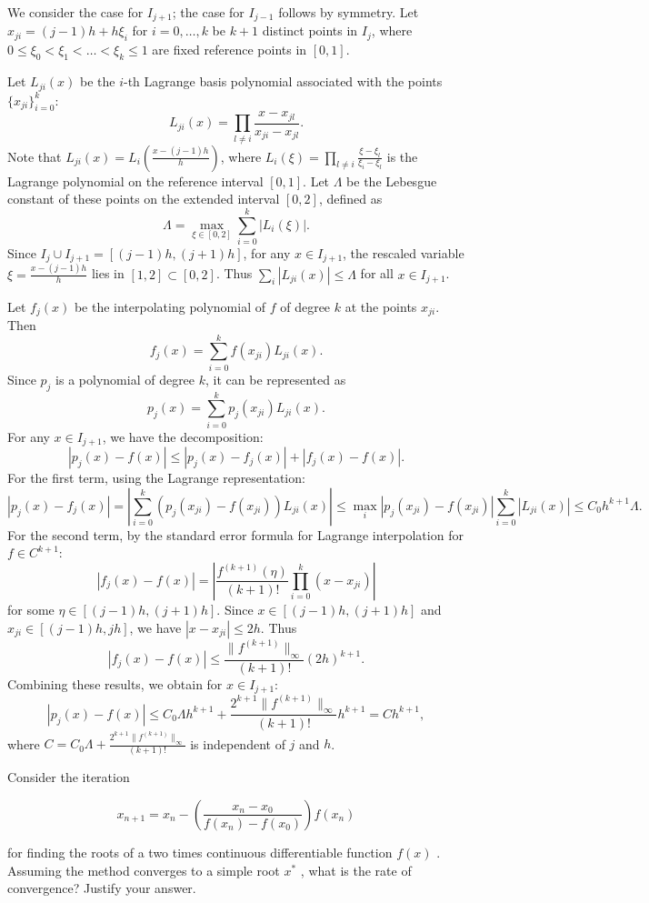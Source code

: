 \begin{solution}
We consider the case for $I_{j+1}$; the case for $I_{j-1}$ follows by symmetry. Let $x_{ji} = (j-1)h + h\xi_i$ for $i=0, \dots, k$ be $k+1$ distinct points in $I_j$, where $0 \leq \xi_0 < \xi_1 < \dots < \xi_k \leq 1$ are fixed reference points in $[0, 1]$.

Let $L_{ji}(x)$ be the $i$-th Lagrange basis polynomial associated with the points $\{x_{ji}\}_{i=0}^k$:
\[
L_{ji}(x) = \prod_{l \neq i} \frac{x - x_{jl}}{x_{ji} - x_{jl}}.
\]
Note that $L_{ji}(x) = L_i(\frac{x - (j-1)h}{h})$, where $L_i(\xi) = \prod_{l \neq i} \frac{\xi - \xi_l}{\xi_i - \xi_l}$ is the Lagrange polynomial on the reference interval $[0, 1]$.
Let $\Lambda$ be the Lebesgue constant of these points on the extended interval $[0, 2]$, defined as
\[
\Lambda = \max_{\xi \in [0, 2]} \sum_{i=0}^k |L_i(\xi)|.
\]
Since $I_j \cup I_{j+1} = [(j-1)h, (j+1)h]$, for any $x \in I_{j+1}$, the rescaled variable $\xi = \frac{x - (j-1)h}{h}$ lies in $[1, 2] \subset [0, 2]$. Thus $\sum_i |L_{ji}(x)| \leq \Lambda$ for all $x \in I_{j+1}$.

Let $f_j(x)$ be the interpolating polynomial of $f$ of degree $k$ at the points $x_{ji}$. Then
\[
f_j(x) = \sum_{i=0}^k f(x_{ji}) L_{ji}(x).
\]
Since $p_j$ is a polynomial of degree $k$, it can be represented as
\[
p_j(x) = \sum_{i=0}^k p_j(x_{ji}) L_{ji}(x).
\]
For any $x \in I_{j+1}$, we have the decomposition:
\[
|p_j(x) - f(x)| \leq |p_j(x) - f_j(x)| + |f_j(x) - f(x)|.
\]
For the first term, using the Lagrange representation:
\[
|p_j(x) - f_j(x)| = \left| \sum_{i=0}^k (p_j(x_{ji}) - f(x_{ji})) L_{ji}(x) \right| \leq \max_{i} |p_j(x_{ji}) - f(x_{ji})| \sum_{i=0}^k |L_{ji}(x)| \leq C_0 h^{k+1} \Lambda.
\]
For the second term, by the standard error formula for Lagrange interpolation for $f \in C^{k+1}$:
\[
|f_j(x) - f(x)| = \left| \frac{f^{(k+1)}(\eta)}{(k+1)!} \prod_{i=0}^k (x - x_{ji}) \right|
\]
for some $\eta \in [(j-1)h, (j+1)h]$. Since $x \in [(j-1)h, (j+1)h]$ and $x_{ji} \in [(j-1)h, jh]$, we have $|x - x_{ji}| \leq 2h$. Thus
\[
|f_j(x) - f(x)| \leq \frac{\|f^{(k+1)}\|_\infty}{(k+1)!} (2h)^{k+1}.
\]
Combining these results, we obtain for $x \in I_{j+1}$:
\[
|p_j(x) - f(x)| \leq C_0 \Lambda h^{k+1} + \frac{2^{k+1} \|f^{(k+1)}\|_\infty}{(k+1)!} h^{k+1} = C h^{k+1},
\]
where $C = C_0 \Lambda + \frac{2^{k+1} \|f^{(k+1)}\|_\infty}{(k+1)!}$ is independent of $j$ and $h$.
\end{solution}

\begin{exercise}
\label{applied:2020:2}
Consider the iteration

\[
x _ {n + 1} = x _ {n} - \left(\frac {x _ {n} - x _ {0}}{f (x _ {n}) - f (x _ {0})}\right) f (x _ {n})
\]

for finding the roots of a two times continuous differentiable function $f ( x )$ . Assuming the method converges to a simple root $x ^ { * }$ , what is the rate of convergence? Justify your answer.
\end{exercise}

